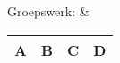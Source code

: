 Groepswerk: &
\begin{tabular}{|c|c|c|c|}
	\hline 
	\textbf{A} & \textbf{B} & \textbf{C} & \textbf{D} \\
	\hline 
\end{tabular} \\